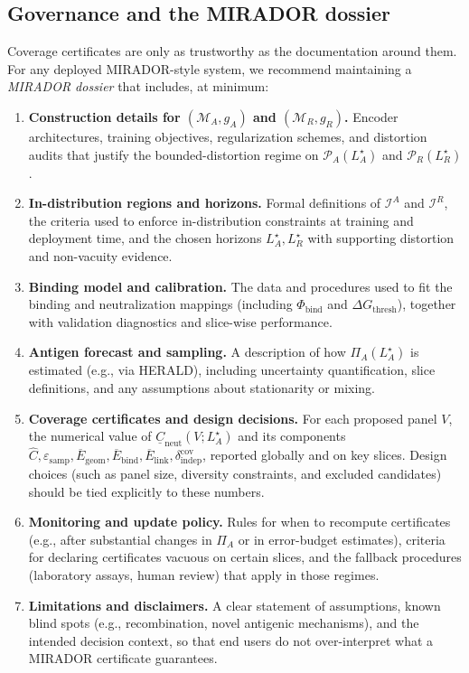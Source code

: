 \documentclass[11pt]{article}
\begin{document}
\subsection{Governance and the MIRADOR dossier}

Coverage certificates are only as trustworthy as the documentation around them. For any deployed
MIRADOR-style system, we recommend maintaining a \emph{MIRADOR dossier} that includes, at
minimum:

\begin{enumerate}
  \item \textbf{Construction details for $(\mathcal{M}_A, g_A)$ and $(\mathcal{M}_R, g_R)$.}
  Encoder architectures, training objectives, regularization schemes, and distortion audits that
  justify the bounded-distortion regime on $\mathcal{P}_A(L_A^\star)$ and $\mathcal{P}_R(L_R^\star)$.

  \item \textbf{In-distribution regions and horizons.}
  Formal definitions of $\mathcal{I}^A$ and $\mathcal{I}^R$, the criteria used to enforce
  in-distribution constraints at training and deployment time, and the chosen horizons
  $L_A^\star, L_R^\star$ with supporting distortion and non-vacuity evidence.

  \item \textbf{Binding model and calibration.}
  The data and procedures used to fit the binding and neutralization mappings (including
  $\Phi_{\mathrm{bind}}$ and $\Delta G_{\mathrm{thresh}}$), together with validation diagnostics and slice-wise
  performance.

  \item \textbf{Antigen forecast and sampling.}
  A description of how $\Pi_A(L_A^\star)$ is estimated (e.g., via HERALD), including uncertainty
  quantification, slice definitions, and any assumptions about stationarity or mixing.

  \item \textbf{Coverage certificates and design decisions.}
  For each proposed panel $V$, the numerical value of
  $\underline{C}_{\mathrm{neut}}(V;L_A^\star)$ and its components
  $\widehat{C},\varepsilon_{\mathrm{samp}},\overline{E}_{\mathrm{geom}},\overline{E}_{\mathrm{bind}},\overline{E}_{\mathrm{link}},
  \delta_{\mathrm{indep}}^{\mathrm{cov}}$, reported globally and on key slices. Design choices
  (such as panel size, diversity constraints, and excluded candidates) should be tied explicitly
  to these numbers.

  \item \textbf{Monitoring and update policy.}
  Rules for when to recompute certificates (e.g., after substantial changes in $\Pi_A$ or in
  error-budget estimates), criteria for declaring certificates vacuous on certain slices, and the
  fallback procedures (laboratory assays, human review) that apply in those regimes.

  \item \textbf{Limitations and disclaimers.}
  A clear statement of assumptions, known blind spots (e.g., recombination, novel antigenic
  mechanisms), and the intended decision context, so that end users do not over-interpret what a
  MIRADOR certificate guarantees.
\end{enumerate}
\end{document}
